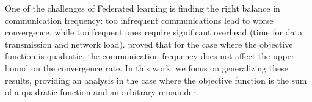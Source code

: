 One of the challenges of Federated learning is finding the right balance in communication frequency: too infrequent communications lead to worse convergence, while too frequent ones require significant overhead (time for data transmission and network load). 
\cite{Woodworth} proved that for the case where the objective function is quadratic, the communication frequency does not affect the upper bound on the convergence rate.
In this work, we focus on generalizing these results, providing an analysis in the case where the objective function is the sum of a quadratic function and an arbitrary remainder.